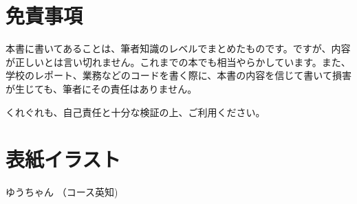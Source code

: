 \section*{免責事項}
本書に書いてあることは、筆者知識のレベルでまとめたものです。ですが、内容が正しいとは言い切れません。これまでの本でも相当やらかしています。また、学校のレポート、業務などのコードを書く際に、本書の内容を信じて書いて損害が生じても、筆者にその責任はありません。

くれぐれも、自己責任と十分な検証の上、ご利用ください。

\section*{表紙イラスト}
ゆうちゃん （コース英知)
